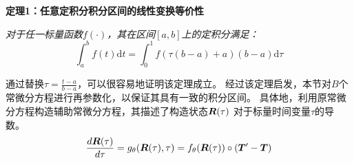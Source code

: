 \textbf{定理1：任意定积分积分区间的线性变换等价性}

\textit{对于任一标量函数$f(\cdot)$，其在区间$[a, b]$上的定积分满足：}
\begin{equation}
\int_{a}^{b}f(t) \text{d}t=\int_{0}^1f(\tau(b-a)+a) (b-a)\text{d}\tau
\end{equation}

通过替换$\tau = \frac{t-a}{b-a}$，可以很容易地证明该定理成立。
经过该定理启发，本节对$B$个常微分方程进行再参数化，以保证其具有一致的积分区间。
具体地，利用原常微分方程构造辅助常微分方程，其描述了构造状态$\boldsymbol{R}(\tau)$ 对于标量时间变量$\tau$的导数。
\begin{equation}
    \frac{d\boldsymbol R(\tau)}{d\tau}=g_{\theta}(\boldsymbol R(\tau), \tau)=f_\theta(\boldsymbol R(\tau))\circ (\boldsymbol{T}'-\boldsymbol{T})
\label{equ:construct_ode}
\end{equation}

